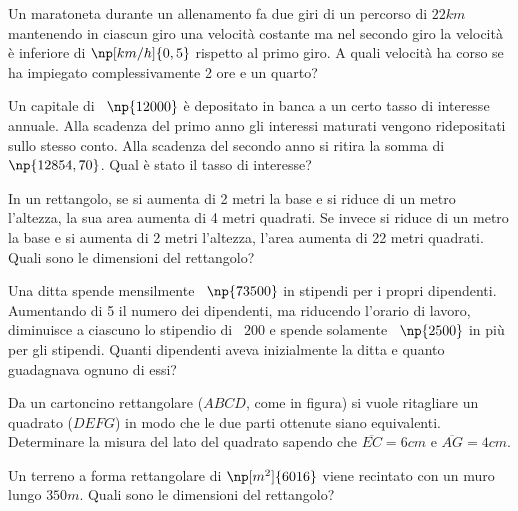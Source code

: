 \begin{multicols}{2}
\begin{esercizio}
 \label{ese:3.146}
Un maratoneta durante un allenamento fa due giri di un percorso di $22\unit{km}$
mantenendo in ciascun giro una velocità costante ma nel secondo giro la
velocità è inferiore di $\np[km/h]{0,5}$ rispetto al primo giro. A quali velocità
ha corso se ha impiegato complessivamente 2 ore e un quarto?
\end{esercizio}

\begin{esercizio}[\Ast]
 \label{ese:3.147}
Un capitale di \officialeuro~$\np{12000}$ è depositato in banca a un certo tasso di interesse
annuale. Alla scadenza del primo anno gli interessi maturati vengono
ridepositati sullo stesso conto. Alla scadenza del secondo anno si ritira la
somma di \officialeuro~$\np{12854,70}$. Qual è stato il tasso di interesse?
\end{esercizio}

\begin{esercizio}
 \label{ese:3.148}
In un rettangolo, se si aumenta di 2 metri la base e si riduce di un metro
l'altezza, la sua area aumenta di 4 metri quadrati. Se invece si riduce di
un metro la base e si aumenta di 2 metri l'altezza, l'area aumenta di 22
metri quadrati. Quali sono le dimensioni del rettangolo?
\end{esercizio}

\begin{esercizio}[\Ast]
 \label{ese:3.149}
Una ditta spende mensilmente \officialeuro~$\np{73500}$ in stipendi per i propri dipendenti.
Aumentando di 5 il numero dei dipendenti, ma riducendo l'orario di lavoro,
diminuisce a ciascuno lo stipendio di \officialeuro~$200$ e spende solamente \officialeuro~$\np{2500}$ in più per
gli stipendi. Quanti dipendenti aveva inizialmente la ditta e quanto
guadagnava ognuno di essi?
\end{esercizio}

\begin{esercizio}
 \label{ese:3.150}
Da un cartoncino rettangolare ($ ABCD $, come in figura) si vuole ritagliare un
quadrato ($ DEFG $) in modo che le due parti ottenute siano equivalenti.
Determinare la misura del lato del quadrato sapendo che
$\overline {EC} = 6\unit{cm} $ e $\overline {AG} = 4\unit{cm}$.
\begin{center}
 
\end{center}
\end{esercizio}

\begin{esercizio}[\Ast]
 \label{ese:3.151}
Un terreno a forma rettangolare di $\np[m^2]{6016}$ viene recintato con un muro lungo
$350\unit{m}$. Quali sono le dimensioni del rettangolo?
\end{esercizio}


\end{multicols}
